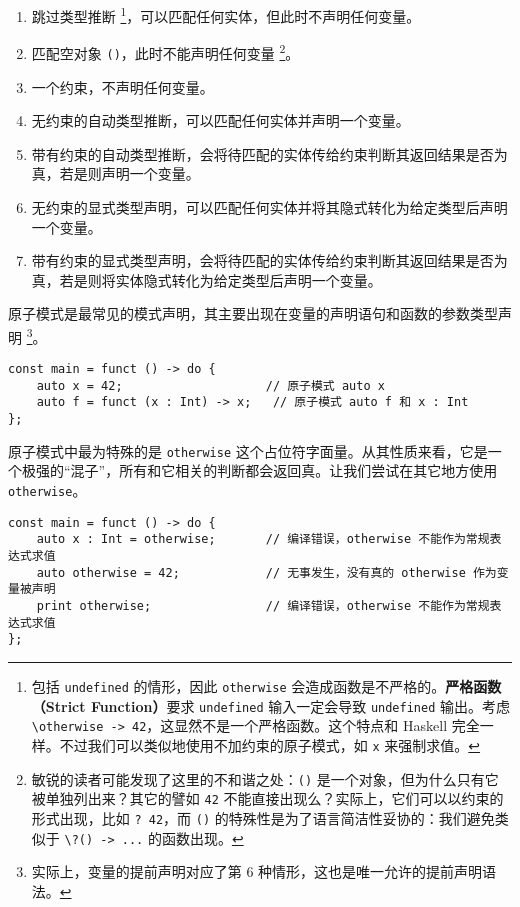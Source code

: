 \begin{enumerate}
    \item 跳过类型推断 \footnote{包括 \lstinline!undefined! 的情形，因此 \lstinline!otherwise! 会造成函数是不严格的。\textbf{严格函数（Strict Function）}要求 \lstinline!undefined! 输入一定会导致 \lstinline!undefined! 输出。考虑 \lstinline!\otherwise -> 42!，这显然不是一个严格函数。这个特点和 Haskell 完全一样。不过我们可以类似地使用不加约束的原子模式，如 \lstinline!x! 来强制求值。}，可以匹配任何实体，但此时不声明任何变量。
    \item 匹配空对象 \lstinline!()!，此时不能声明任何变量 \footnote{敏锐的读者可能发现了这里的不和谐之处：\lstinline!()! 是一个对象，但为什么只有它被单独列出来？其它的譬如 \lstinline!42! 不能直接出现么？实际上，它们可以以约束的形式出现，比如 \lstinline!? 42!，而 \lstinline!()! 的特殊性是为了语言简洁性妥协的：我们避免类似于 \lstinline!\?() -> ...! 的函数出现。}。
    \item 一个约束，不声明任何变量。
    \item 无约束的自动类型推断，可以匹配任何实体并声明一个变量。
    \item 带有约束的自动类型推断，会将待匹配的实体传给约束判断其返回结果是否为真，若是则声明一个变量。
    \item 无约束的显式类型声明，可以匹配任何实体并将其隐式转化为给定类型后声明一个变量。
    \item 带有约束的显式类型声明，会将待匹配的实体传给约束判断其返回结果是否为真，若是则将实体隐式转化为给定类型后声明一个变量。
\end{enumerate}

原子模式是最常见的模式声明，其主要出现在变量的声明语句和函数的参数类型声明 \footnote{实际上，变量的提前声明对应了第 6 种情形，这也是唯一允许的提前声明语法。}。

\begin{lstlisting}
const main = funct () -> do {
    auto x = 42;                    // 原子模式 auto x
    auto f = funct (x : Int) -> x;   // 原子模式 auto f 和 x : Int
};
\end{lstlisting}

原子模式中最为特殊的是 \lstinline!otherwise! 这个占位符字面量。从其性质来看，它是一个极强的“混子”，所有和它相关的判断都会返回真。让我们尝试在其它地方使用 \lstinline!otherwise!。

\begin{minipage}[c]{0.95\textwidth}
\vspace{1.0em}
\begin{lstlisting}
const main = funct () -> do {
    auto x : Int = otherwise;		// 编译错误，otherwise 不能作为常规表达式求值
    auto otherwise = 42;			// 无事发生，没有真的 otherwise 作为变量被声明
    print otherwise;				// 编译错误，otherwise 不能作为常规表达式求值
};
\end{lstlisting}
\end{minipage}

